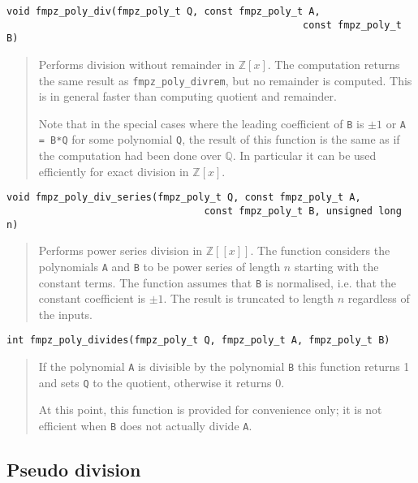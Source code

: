 \documentclass[a4paper,10pt]{article}
\newcommand{\Z}{\mathbb{Z}}
\newcommand{\Q}{\mathbb{Q}}
\newcommand{\code}{\lstinline}
\begin{document}
\begin{lstlisting}
void fmpz_poly_div(fmpz_poly_t Q, const fmpz_poly_t A, 
                                                   const fmpz_poly_t B) 
\end{lstlisting}
\begin{quote}
Performs division without remainder in $\Z[x]$. The computation returns the same result as \code{fmpz_poly_divrem}, but no remainder is computed. This is in general faster than computing quotient and remainder. 

Note that in the special cases where the leading coefficient of \code{B} is $\pm 1$ or \code{A = B*Q} for some polynomial \code{Q}, the result of this function is the same as if the computation had been done over $\Q$. In particular it can be used efficiently for exact division in $\Z[x]$.
\end{quote}

\begin{lstlisting}
void fmpz_poly_div_series(fmpz_poly_t Q, const fmpz_poly_t A, 
                                  const fmpz_poly_t B, unsigned long n) 
\end{lstlisting}
\begin{quote}
Performs power series division in $\Z[[x]]$. The function considers the polynomials \code{A} and \code{B} to be power series of length $n$ starting with the constant terms. The function assumes that \code{B} is normalised, i.e. that the constant coefficient is $\pm 1$. The result is truncated to length $n$ regardless of the inputs.
\end{quote}

\begin{lstlisting}
int fmpz_poly_divides(fmpz_poly_t Q, fmpz_poly_t A, fmpz_poly_t B)
\end{lstlisting}
\begin{quote}
If the polynomial \code{A} is divisible by the polynomial \code{B} this function returns 1 and sets \code{Q} to the quotient, otherwise it returns 0.

At this point, this function is provided for convenience only; it is not efficient when \code{B} does not actually divide \code{A}. 
\end{quote}

\subsection{Pseudo division}
\end{document}
